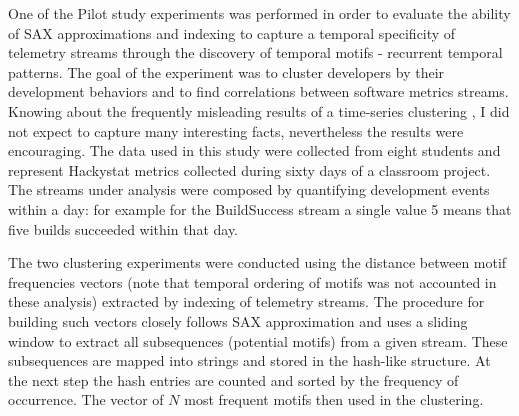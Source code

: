 \documentclass{sig-alternate}
\begin{document}
One of the Pilot study experiments was performed in order to evaluate the ability of SAX approximations and indexing to capture a temporal specificity of telemetry streams through the discovery of temporal motifs - recurrent temporal patterns. The goal of the experiment was to cluster developers by their development behaviors and to find correlations between software metrics streams. Knowing about the frequently misleading results of a time-series clustering \cite{citeulike:227029}, I did not expect to capture many interesting facts, nevertheless the results were encouraging. The data used in this study were collected from eight students and represent Hackystat metrics collected during sixty days of a classroom project. The streams under analysis were composed by quantifying development events within a day: for example for the BuildSuccess stream a single value 5 means that five builds succeeded within that day. 

The two clustering experiments were conducted using the distance between motif frequencies vectors (note that temporal ordering of motifs was not accounted in these analysis) extracted by indexing of telemetry streams. The procedure for building such vectors closely follows SAX approximation and uses a sliding window to extract all subsequences (potential motifs) from a given stream. These subsequences are mapped into strings and stored in the hash-like structure. At the next step the hash entries are counted and sorted by the frequency of occurrence. The vector of $N$ most frequent motifs then used in the clustering.
\end{document}
